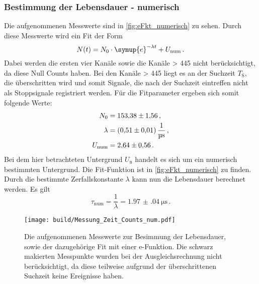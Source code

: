   \subsubsection{Bestimmung der Lebensdauer - numerisch}
    Die aufgenommenen Messwerte sind in \autoref{fig:eFkt_numerisch} zu sehen.
    Durch diese Messwerte wird ein Fit der Form
    \begin{equation*}
      N(t) = N_0 \cdot \symup{e}^{-\lambda t} +U_\text{num} \, .
    \end{equation*}
    Dabei werden die ersten vier Kanäle sowie die Kanäle > 445 nicht berücksichtigt, da diese Null Counts haben.
    Bei den Kanäle > 445 liegt es an der Suchzeit $T_\text{S}$, die überschritten wird und somit Signale, die nach der Suchzeit eintreffen nicht als Stoppsignale registriert werden.
    Für die Fitparameter ergeben sich somit folgende Werte:
    \begin{align*}
      N_0 &= \num{153.38 \pm 1.56} \, ,\\
      \lambda &= \SI{0.51(01)}{\per\micro\second} \, ,\\
      U_\text{num} &= \num{2.64 \pm 0.56} \, .
    \end{align*}
    Bei dem hier betrachteten Untergrund $U_\text{n}$ handelt es sich um ein numerisch bestimmten Untergrund.
    Die Fit-Funktion ist in \autoref{fig:eFkt_numerisch} zu finden.
    Durch die bestimmte Zerfallskonstante $\lambda$ kann nun die Lebensdauer berechnet werden.
    Es gilt
    \begin{equation*}
      \tau_\text{num} = \frac{1}{\lambda} = \SI{1.97(04)}{\micro\second} \, .
    \end{equation*}
    \begin{figure}[h]
      \centering
      \texttt{[image: build/Messung\_Zeit\_Counts\_num.pdf]}
      \caption{Die aufgenommenen Messwerte zur Besimmung der Lebensdauer, sowie der dazugehörige Fit mit einer e-Funktion.
                Die schwarz makierten Messpunkte wurden bei der Ausgleichsrechnung nicht berücksichtigt, da diese teilweise aufgrund der überschrittenen Suchzeit keine Ereignisse haben.}
      \label{fig:eFkt_numerisch}
    \end{figure}

